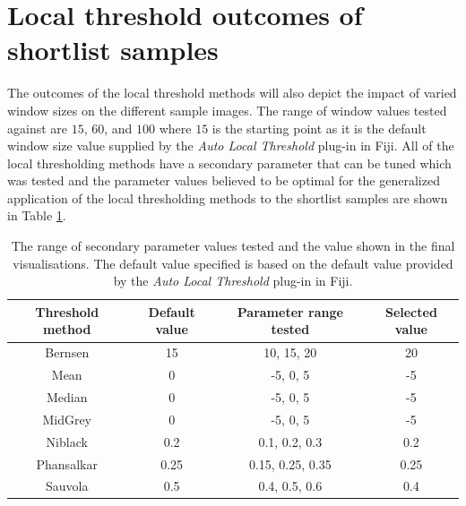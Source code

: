 \section{Local threshold outcomes of shortlist samples}\label{appen_sec:local_shortlist}
The outcomes of the local threshold methods will also depict the impact of varied window sizes on the different sample images. The range of window values tested against are $15$, $60$, and $100$ where $15$ is the starting point as it is the default window size value supplied by the \textit{Auto Local Threshold} plug-in in Fiji. All of the local thresholding methods have a secondary parameter that can be tuned which was tested and the parameter values believed to be optimal for the generalized application of the local thresholding methods to the shortlist samples are shown in Table \ref{appen_table:shortlist_colour_mappings}.
\begin{table}[hb!]
	\centering
	\begin{tabular}{|c|c|c|c|}
		\hline
		\textbf{Threshold method} & \textbf{Default value} & \textbf{Parameter range tested} & \textbf{Selected value} \\
		\hline
		Bernsen & 15 & 10, 15, 20 & 20 \\
		\hline
		Mean & 0 & -5, 0, 5 & -5 \\
		\hline
		Median & 0 & -5, 0, 5 & -5 \\
		\hline
		MidGrey & 0 & -5, 0, 5 & -5 \\
		\hline
		Niblack & 0.2 & 0.1, 0.2, 0.3 & 0.2 \\
		\hline
		Phansalkar & 0.25 & 0.15, 0.25, 0.35 & 0.25 \\
		\hline
		Sauvola & 0.5 & 0.4, 0.5, 0.6 & 0.4 \\
		\hline
	\end{tabular}
	\caption[The range of secondary parameter values tested and the value shown in the final visualisations]{The range of secondary parameter values tested and the value shown in the final visualisations. The default value specified is based on the default value provided by the \textit{Auto Local Threshold} plug-in in Fiji.}
	\label{appen_table:shortlist_colour_mappings}
\end{table}


